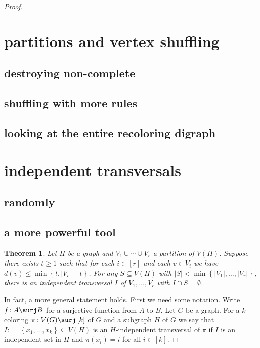 \documentclass{amsbook}
\theoremstyle{plain}
\newtheorem{theorem}{Theorem}
\numberwithin{equation}{chapter}
\newcommand{\set}[1]{\left\{ #1 \right\}}
\newcommand{\card}[1]{\left|#1\right|}
\newcommand{\funcsurj}[3]{#1\colon #2 \surj #3}
\newcommand{\irange}[1]{\left[#1\right]}
\newcommand{\DefinedAs}{\mathrel{\mathop:}=}
\begin{document}
\begin{proof}
\chapter*{partitions and vertex shuffling}
\section*{destroying non-complete}
\section*{shuffling with more rules}
\section*{looking at the entire recoloring digraph}

\chapter*{independent transversals}
\section*{randomly}
\section*{a more powerful tool}
\begin{theorem}\label{LopsidedTransversal}
Let $H$ be a graph and $V_1 \cup \cdots \cup V_r$ a partition of $V(H)$.  
Suppose there exists $t \geq 1$ such that for each $i \in \irange{r}$ and each $v \in V_i$ we have $d(v) \leq \min\set{t, \card{V_i}-t}$.  For any $S \subseteq V(H)$ with $\card{S} < \min\set{\card{V_1}, \ldots, \card{V_r}}$, there is an independent transversal $I$ of $V_1, \ldots, V_r$ with $I \cap S = \emptyset$.
\end{theorem}

In fact, a more general statement holds. 
First we need some notation. 
Write $\funcsurj{f}{A}{B}$ for a surjective function from $A$ to $B$.  
Let $G$ be a graph.  
For a $k$-coloring $\funcsurj{\pi}{V(G)}{\irange{k}}$ of $G$ and a subgraph $H$ of $G$ we say 
that $I \DefinedAs \set{x_1, \ldots, x_k} \subseteq V(H)$ is an $H$-independent transversal of $\pi$ if $I$ is an independent 
set in $H$ and $\pi(x_i) = i$ for all $i \in \irange{k}$.


\end{proof}
\end{document}
